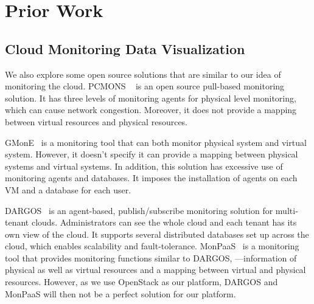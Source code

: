 

\section{Prior Work}
\label{sec:PriorWork}



\subsection{Cloud Monitoring Data Visualization}

  We also explore some open source solutions that are similar to our idea of monitoring the cloud. PCMONS ~\cite{chaves2011toward} is an open source pull-based monitoring solution. It has three levels of monitoring agents for physical level monitoring, which can cause network congestion. Moreover, it does not provide a mapping between virtual resources and physical resources. 

  GMonE~\cite{montes2013gmone} is a monitoring tool that can both monitor physical system and virtual system. However, it doesn't specify it can provide a mapping between physical systems and virtual systems. In addition, this solution has excessive use of monitoring agents and databases. It imposes the installation of agents on each VM and a database for each user. 

  DARGOS~\cite{povedano2013dargos}  is an agent-based, publish/subscribe monitoring solution for multi-tenant clouds. Administrators can see the whole cloud and each tenant has its own view of the cloud. It supports several distributed databases set up across the cloud, which enables scalability and fault-tolerance. MonPaaS~\cite{alcaraz2015monpaas} is a monitoring tool that provides monitoring functions similar to DARGOS, —information of physical as well as virtual resources and a mapping between virtual and physical resources. However, as we use OpenStack as our platform, DARGOS and MonPaaS will then not be a perfect solution for our  platform.